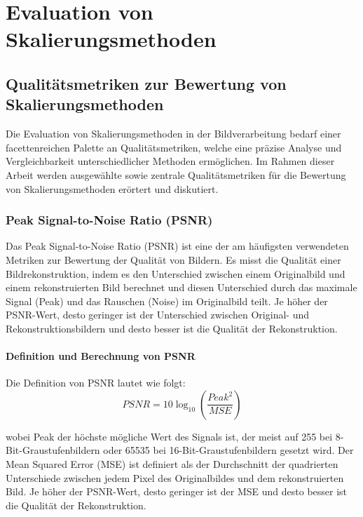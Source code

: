 

\chapter{Evaluation von Skalierungsmethoden}

\section{Qualitätsmetriken zur Bewertung von Skalierungsmethoden}

    Die Evaluation von Skalierungsmethoden in der Bildverarbeitung bedarf einer facettenreichen Palette an Qualitätsmetriken, welche eine präzise Analyse und Vergleichbarkeit unterschiedlicher Methoden ermöglichen. 
    Im Rahmen dieser Arbeit werden ausgewählte sowie zentrale Qualitätsmetriken für die Bewertung von Skalierungsmethoden erörtert und diskutiert.

    \subsection{Peak Signal-to-Noise Ratio (PSNR)}
        Das Peak Signal-to-Noise Ratio (PSNR) ist eine der am häufigsten verwendeten Metriken zur Bewertung der Qualität von Bildern. 
        Es misst die Qualität einer Bildrekonstruktion, indem es den Unterschied zwischen einem Originalbild und einem rekonstruierten Bild berechnet und diesen Unterschied durch das maximale Signal (Peak) und das Rauschen (Noise) im Originalbild teilt. 
        Je höher der PSNR-Wert, desto geringer ist der Unterschied zwischen Original- und Rekonstruktionsbildern und desto besser ist die Qualität der Rekonstruktion.
        
        \subsubsection{Definition und Berechnung von \ac{PSNR}}
            Die Definition von PSNR lautet wie folgt:
            \begin{equation}
            PSNR = 10 \log_{10} \left( \frac{Peak^2}{MSE} \right) 
            \end{equation}
            
            wobei Peak der höchste mögliche Wert des Signals ist, der meist auf 255 bei 8-Bit-Graustufenbildern oder 65535 bei 16-Bit-Graustufenbildern gesetzt wird. %
            Der Mean Squared Error (MSE) ist definiert als der Durchschnitt der quadrierten Unterschiede zwischen jedem Pixel des Originalbildes und dem rekonstruierten Bild. 
            Je höher der PSNR-Wert, desto geringer ist der MSE und desto besser ist die Qualität der Rekonstruktion.
